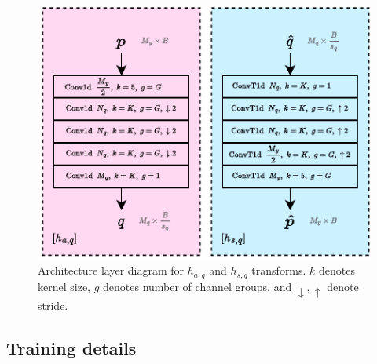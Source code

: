 \begin{figure}[htbp]
  \centering
  \includegraphics[width=0.8\linewidth]{img/pdf_compression/arch-hasq.pdf}
  \caption[Architecture layer diagram for $h_{a,q}$ and $h_{s,q}$ transforms]{%
    Architecture layer diagram for $h_{a,q}$ and $h_{s,q}$ transforms.
    $k$ denotes kernel size, $g$ denotes number of channel groups, and $\downarrow, \uparrow$ denote stride.%
  }
  \label{fig:pdf/arch-hasq}
\end{figure}

%
%


\subsection{Training details}
\label{sec:pdf_compression/experimental_setup/training_details}

